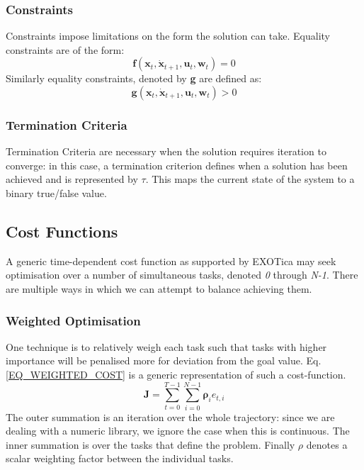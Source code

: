 \documentclass[12pt,a4paper,onecolumn]{article}
\begin{document}
\subsubsection*{Constraints}
Constraints impose limitations on the form the solution can take. Equality constraints are of the form:
\begin{equation}
\mathbf{f}\left(\mathbf{x}_t, \mathbf{\dot x}_{t+1}, \mathbf{u}_t, \mathbf{w}_t\right) = 0 \label{EQ_EQUALITY_CONSTRAINT}
\end{equation}
Similarly equality constraints, denoted by \textbf{g} are defined as:
\begin{equation}
\mathbf{g}\left(\mathbf{x}_t, \mathbf{\dot x}_{t+1}, \mathbf{u}_t, \mathbf{w}_t\right) > 0 \label{EQ_INEQUALITY_CONSTRAINT}
\end{equation}

\subsubsection*{Termination Criteria}
Termination Criteria are necessary when the solution requires iteration to converge: in this case, a termination criterion defines when a solution has been achieved and is represented by $\tau$. This maps the current state of the system to a binary true/false value.

\subsection{Cost Functions}
A generic time-dependent cost function as supported by EXOTica may seek optimisation over a number of simultaneous tasks, denoted \textit{0} through \textit{N-1}. There are multiple ways in which we can attempt to balance achieving them.

\subsubsection*{Weighted Optimisation}
One technique is to relatively weigh each task such that tasks with higher importance will be penalised more for deviation from the goal value. Eq.\ref{EQ_WEIGHTED_COST} is a generic representation of such a cost-function.
\begin{equation}
\mathbf{J} = \sum_{t=0}^{T-1}\sum_{i=0}^{N-1}\mathbf{\rho}_i e_{t,i} \label{EQ_WEIGHTED_COST}
\end{equation}
The outer summation is an iteration over the whole trajectory: since we are dealing with a numeric library, we ignore the case when this is continuous. The inner summation is over the tasks that define the problem. Finally $\rho$ denotes a scalar weighting factor between the individual tasks.
\end{document}
